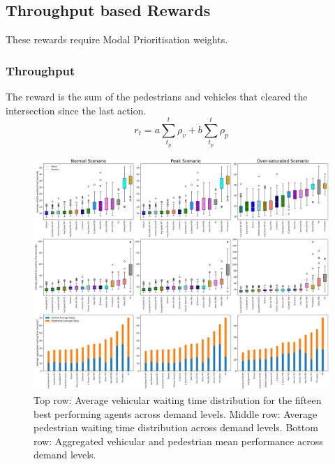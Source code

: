 \documentclass[conference]{IEEEtran}
\begin{document}
\subsection{Throughput based Rewards}
These rewards require Modal Prioritisation weights.
\subsubsection{Throughput}
The reward is the sum of the pedestrians and vehicles that cleared the intersection since the last action.
\begin{equation}
    r_t = a \sum_{t_p}^t \rho_v + b \sum_{t_p}^t \rho_p
\label{eq:throughput}
\end{equation}
\begin{figure}                                                
\centering                                                    
\includegraphics[width=\textwidth]{9grid_ordered_boxplot_all.png}                                    
\caption{Top row: Average vehicular waiting time distribution for the fifteen best performing agents across demand levels. Middle row: Average pedestrian waiting time distribution across demand levels. Bottom row: Aggregated vehicular and pedestrian mean performance across demand levels.}                                  
\label{fig:results_9_grid}                                               
\end{figure}
\end{document}
